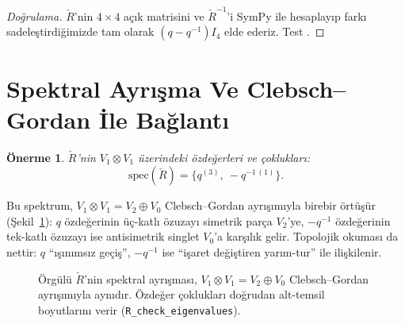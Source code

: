 \documentclass[12pt,a4paper,fleqn]{report}
\numberwithin{equation}{chapter}
\theoremstyle{plain}
\newtheorem{proposition}[theorem]{Önerme}
\theoremstyle{definition}
\newcommand{\Rcheck}{\check{R}}
\begin{document}
\begin{proof}[Doğrulama]
$\check R$'nin $4 \times 4$ açık matrisini ve $\check R^{-1}$'i SymPy
ile hesaplayıp farkı sadeleştirdiğimizde tam olarak
$(q - q^{-1}) I_4$ elde ederiz. Test
.
\end{proof}

\section{Spektral Ayrışma Ve Clebsch--Gordan İle Bağlantı}

\begin{proposition}\label{prop:eigs}
$\check R$'nin $V_1 \otimes V_1$ üzerindeki özdeğerleri ve çoklukları:
\begin{equation}
  \mathrm{spec}(\check R) = \{q^{(3)},\ -q^{-1\,(1)}\}.
\end{equation}
\end{proposition}

Bu spektrum, $V_1 \otimes V_1 = V_2 \oplus V_0$ Clebsch--Gordan ayrışımıyla
birebir örtüşür (Şekil~\ref{fig:spec}): $q$ özdeğerinin üç-katlı özuzayı simetrik
parça $V_2$'ye, $-q^{-1}$ özdeğerinin tek-katlı özuzayı ise antisimetrik singlet
$V_0$'a karşılık gelir. Topolojik okuması da nettir: $q$ ``ışınımsız geçiş'',
$-q^{-1}$ ise ``işaret değiştiren yarım-tur'' ile ilişkilenir.

\begin{figure}[h]
\centering
{}
\caption{Örgülü $\Rcheck$'nin spektral ayrışması, $V_1\otimes V_1=V_2\oplus V_0$
Clebsch--Gordan ayrışımıyla aynıdır. Özdeğer çoklukları doğrudan alt-temsil
boyutlarını verir (\texttt{R\_check\_eigenvalues}).}
\label{fig:spec}
\end{figure}
\end{document}
